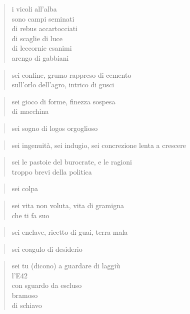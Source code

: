 \begin{verse}
    i vicoli all'alba\\
    sono campi seminati\\
    di rebus accartocciati\\
    di scaglie di luce\\
    di leccornie esanimi\\
    arengo di gabbiani
\end{verse}

\clearpage


\begin{verse}
    sei confine, grumo rappreso di cemento\\
    sull'orlo dell'agro, intrico di gusci
\end{verse}

\begin{verse}
    sei gioco di forme, finezza sospesa\\
    di macchina
\end{verse}

\begin{verse}
    sei sogno di logos orgoglioso
\end{verse}

\begin{verse}
    sei ingenuità, sei indugio, sei concrezione
    lenta a crescere
\end{verse}

\begin{verse}
    sei le pastoie del burocrate, e le ragioni\\
    troppo brevi della politica
\end{verse}

\begin{verse}
    sei colpa
\end{verse}

\begin{verse}
    sei vita non voluta, vita di gramigna\\
    che ti fa suo
\end{verse}

\begin{verse}
    sei enclave, ricetto di guai, terra mala
\end{verse}

\begin{verse}
    sei coagulo di desiderio
\end{verse}

\begin{verse}
    sei tu (dicono) a guardare di laggiù\\
    l’E42\\
    con sguardo da escluso\\
    bramoso\\
    di schiavo
\end{verse}

